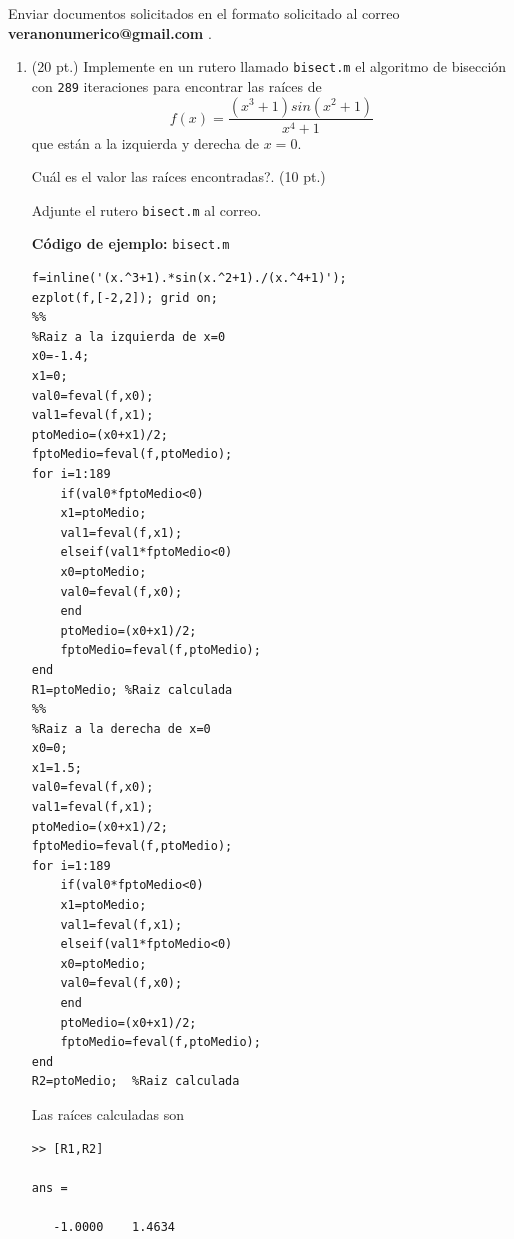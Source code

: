 \documentclass[11pt]{article}
\begin{document}
Enviar documentos solicitados en el formato solicitado al correo 
\textbf{veranonumerico@gmail.com} .
\begin{enumerate}
\item (20 pt.) Implemente en un rutero llamado \texttt{bisect.m} el algoritmo de bisecci\'on con \texttt{289} iteraciones para encontrar las ra\'ices de 
$$
f(x)= \frac{(x^3+1)sin(x^2+1)}{x^4+1}
$$
que est\'an a la izquierda y derecha de $x=0$.

\textquestiondown Cu\'al es el valor las ra\'ices encontradas?. (10 pt.)

\fbox{ \begin{minipage}{\textwidth}   \hfill\vspace{1cm}   \end{minipage} } 

Adjunte el rutero \texttt{bisect.m} al correo.

\textbf{C\'odigo de ejemplo:} \texttt{bisect.m}  

\begin{lstlisting}
f=inline('(x.^3+1).*sin(x.^2+1)./(x.^4+1)');
ezplot(f,[-2,2]); grid on;
%%
%Raiz a la izquierda de x=0
x0=-1.4;
x1=0;
val0=feval(f,x0);
val1=feval(f,x1);
ptoMedio=(x0+x1)/2;
fptoMedio=feval(f,ptoMedio);
for i=1:189
    if(val0*fptoMedio<0)
    x1=ptoMedio;
    val1=feval(f,x1);
    elseif(val1*fptoMedio<0)
    x0=ptoMedio;
    val0=feval(f,x0);
    end
    ptoMedio=(x0+x1)/2;
    fptoMedio=feval(f,ptoMedio);    
end
R1=ptoMedio; %Raiz calculada
%% 
%Raiz a la derecha de x=0
x0=0;
x1=1.5;
val0=feval(f,x0);
val1=feval(f,x1);
ptoMedio=(x0+x1)/2;
fptoMedio=feval(f,ptoMedio);
for i=1:189
    if(val0*fptoMedio<0)
    x1=ptoMedio;
    val1=feval(f,x1);
    elseif(val1*fptoMedio<0)
    x0=ptoMedio;
    val0=feval(f,x0);
    end
    ptoMedio=(x0+x1)/2;
    fptoMedio=feval(f,ptoMedio);    
end
R2=ptoMedio;  %Raiz calculada
\end{lstlisting}

Las ra\'ices calculadas son

\begin{minipage}{0.8\textwidth}
\begin{verbatim}
>> [R1,R2]

ans =

   -1.0000    1.4634
\end{verbatim}
\end{minipage}
\begin{minipage}{0.2\textwidth}
\end{minipage}


\end{enumerate}
\end{document}
